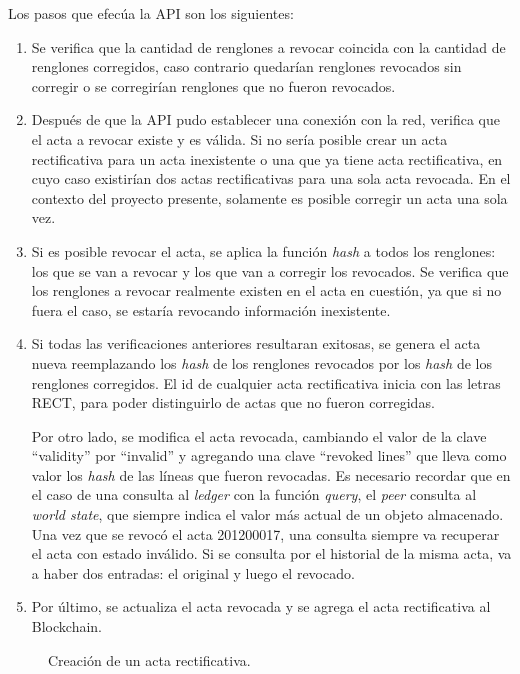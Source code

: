 Los pasos que efecúa la API son los siguientes:
\begin{enumerate}
    \item Se verifica que la cantidad de renglones a revocar coincida con la cantidad de renglones corregidos, caso contrario quedarían renglones revocados sin corregir o se corregirían renglones que no fueron revocados.
    \item Después de que la API pudo establecer una conexión con la red, verifica que el acta a revocar existe y es válida. Si no sería posible crear un acta rectificativa para un acta inexistente o una que ya tiene acta rectificativa, en cuyo caso existirían dos actas rectificativas para una sola acta revocada. En el contexto del proyecto presente, solamente es posible corregir un acta una sola vez.
    \item Si es posible revocar el acta, se aplica la función \textit{hash} a todos los renglones: los que se van a revocar y los que van a corregir los revocados. Se verifica que los renglones a revocar realmente existen en el acta en cuestión, ya que si no fuera el caso, se estaría revocando información inexistente.
    \item Si todas las verificaciones anteriores resultaran exitosas, se genera el acta nueva reemplazando los \textit{hash} de los renglones revocados por los \textit{hash} de los renglones corregidos. El id de cualquier acta rectificativa inicia con las letras RECT, para poder distinguirlo de actas que no fueron corregidas.
    
    Por otro lado, se modifica el acta revocada, cambiando el valor de la clave ``validity'' por ``invalid'' y agregando una clave ``revoked lines'' que lleva como valor los \textit{hash} de las líneas que fueron revocadas. Es necesario recordar que en el caso de una consulta al \textit{ledger} con la función \textit{query}, el \textit{peer} consulta al \textit{world state}, que siempre indica el valor más actual de un objeto almacenado. Una vez que se revocó el acta 201200017, una consulta siempre va recuperar el acta con estado inválido. Si se consulta por el historial de la misma acta, va a haber dos entradas: el original y luego el revocado.
    \item Por último, se actualiza el acta revocada y se agrega el acta rectificativa al Blockchain.
\end{enumerate}
\begin{figure}[H]
    \caption{Creación de un acta rectificativa.}
    \label{fig:revoke_api}
\end{figure}
